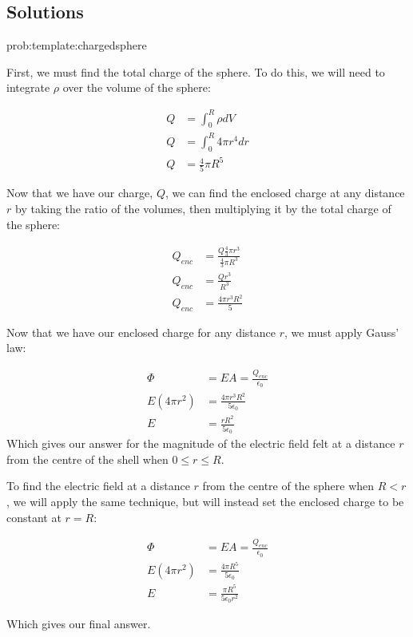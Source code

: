 \newpage
\subsection{Solutions}
\begin{solution}{prob:template:chargedsphere}\label{soln:template:chargedsphere}

First, we must find the total charge of the sphere. To do this, we will need to integrate $\rho$ over the volume of the sphere:


\begin{align*}
Q& = \int_{0}^{R} \rho dV\\
Q&= \int_{0}^{R} 4\pi r^4 dr\\
Q& = \frac{4}{5} \pi R^5
\end{align*}

Now that we have our charge, $Q$, we can find the enclosed charge at any distance $r$ by taking the ratio of the volumes, then multiplying it by the total charge of the sphere:

\begin{align*}
Q_{enc}& = \frac{Q \frac{4}{3}\pi r^3}{\frac{4}{3}\pi R^3}\\
Q_{enc}&= \frac{Qr^3}{R^3}\\
Q_{enc}&=\frac{4\pi r^3 R^2}{5}
\end{align*}

Now that we have our enclosed charge for any distance $r$, we must apply Gauss' law:

\begin{align*}
\Phi & = EA = \frac{Q_{enc}}{\epsilon_0}\\
E(4\pi r^2)&= \frac{4\pi r^3 R^2}{5\epsilon_0}\\
E &= \frac{r R^2}{5\epsilon_0}
\end{align*}
Which gives our answer for the magnitude of the electric field felt at a distance $r$ from the centre of the shell when $0\leq r \leq R$.

To find the electric field at a distance $r$ from the centre of the sphere when $R<r$, we will apply the same technique, but will instead set the enclosed charge to be constant at $r = R$:

\begin{align*}
	\Phi & = EA = \frac{Q_{enc}}{\epsilon_0}\\
	E(4\pi r^2)&= \frac{4\pi R^5}{5\epsilon_0}\\
	E&= \frac{\pi R^5}{5\epsilon_0 r^2}
\end{align*}

Which gives our final answer.

\end{solution}



